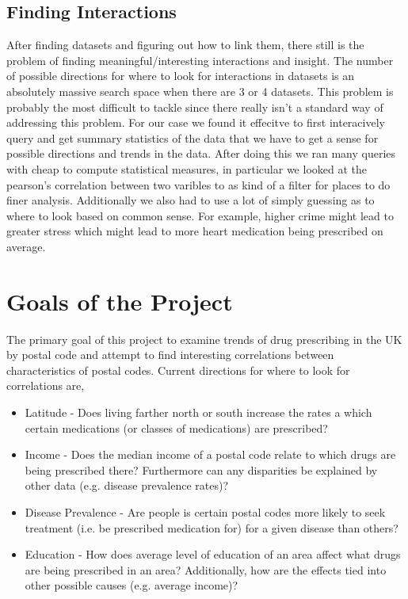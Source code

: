 \documentclass[a4paper]{article}
\begin{document}
	
	\subsection{Finding Interactions}
		After finding datasets and figuring out how to link them, there still is the problem of finding 
		meaningful/interesting interactions and insight. The number of possible directions for where to look for
		interactions in datasets is an absolutely massive search space when there are 3 or 4 datasets. This problem 
		is probably the most difficult to tackle since there really isn't a standard way of addressing this 
		problem. For our case we found it effecitve to first interacively query and get summary statistics of the data
		that we have to get a sense for possible directions and trends in the data. After doing this we ran many queries with cheap to 
		compute statistical measures, in particular we looked at the pearson's correlation between two varibles to as kind of 
		a filter for places to do finer analysis. Additionally we also had to use a lot of simply guessing as to
		where to look based on common sense. For example, higher crime might lead to greater stress which might lead 
		to more heart medication being prescribed on average.


\section{Goals of the Project}

	The primary goal of this project to examine trends of drug prescribing in the UK by postal code
	and attempt to find interesting correlations between characteristics of postal codes. Current directions for where to look for correlations are, 
	\begin{itemize}
		\item Latitude - Does living farther north or south increase the rates a which certain medications (or classes of medications) are 
				prescribed?
		\item Income - Does the median income of a postal code relate to which drugs are being prescribed there? Furthermore
				 	can any disparities be explained by other data (e.g. disease prevalence rates)?

		\item Disease Prevalence - Are people is certain postal codes more likely to seek treatment (i.e. be prescribed medication for) for a given disease than others?

		\item Education - How does average level of education of an area affect what drugs are being prescribed in an area?
							Additionally, how are the effects tied into other possible causes (e.g. average income)?
	\end{itemize}
\end{document}
